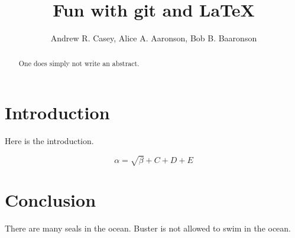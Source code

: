 \documentclass{article}
\begin{document}
\title{Fun with git and \LaTeX{}}
\author{Andrew R. Casey, Alice A. Aaronson, Bob B. Baaronson}

\maketitle

\begin{abstract}
One does simply not write an abstract.
\end{abstract}

\section{Introduction}
Here is the introduction.

\begin{equation}
    \label{simple_equation}
    \alpha = \sqrt{ \beta } + C + D + E
\end{equation}


\section{Conclusion}
There are many seals in the ocean. Buster is not allowed to swim in the ocean.
\end{document}

